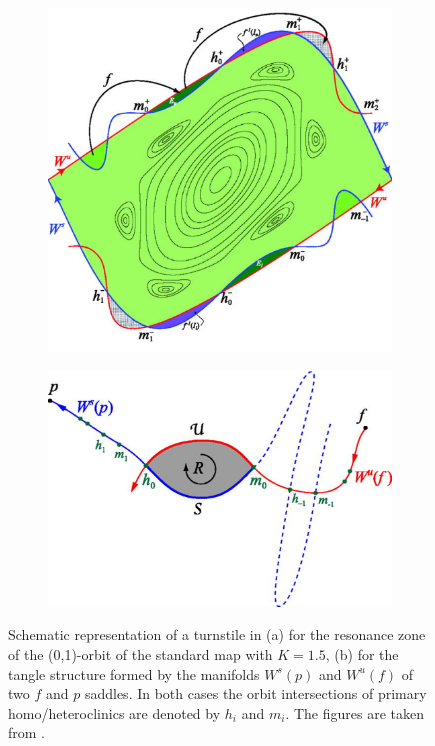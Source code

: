 \begin{figure}[H]
    \centering
    \begin{subfigure}[t]{0.49\textwidth}
        \centering
        \includegraphics[width=\textwidth]{images/turnstile/01Resonance.png}
        \caption{}
        \label{fig:standardmap-turn}
    \end{subfigure}
    \hfill
    \begin{subfigure}[t]{0.49\textwidth}
        \centering
        \includegraphics[width=\textwidth]{images/turnstile/2DLobe.png}
        \caption{}
        \label{fig:meiss-countour}
    \end{subfigure}
    \caption{Schematic representation of a turnstile in (a) for the resonance zone of the (0,1)-orbit of the standard map with $K = 1.5$, (b) for the tangle structure formed by the manifolds $W^s(p)$ and $W^u(f)$ of two $f$ and $p$ saddles. In both cases the orbit intersections of primary homo/heteroclinics are denoted by $h_i$ and $m_i$. The figures are taken from \cite{meiss_thirty_2015}.}
\end{figure}

